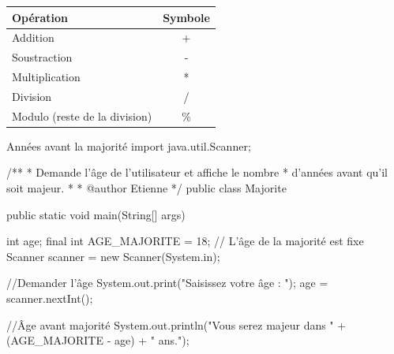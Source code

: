 \documentclass[12pt]{report}
\begin{document}
\begin{center}
\begin{tabularx}{0.5\linewidth}{X c} \toprule
\textbf{Opération} & \textbf{Symbole} \\ \midrule
Addition & + \\
Soustraction & - \\
Multiplication & * \\
Division & / \\
Modulo {\footnotesize (reste de la division)} & \% \\ \bottomrule
\end{tabularx}
\end{center}

\begin{MyTCB}{Années avant la majorité}
import java.util.Scanner;

/**
 * Demande l'âge de l'utilisateur et affiche le nombre
 * d'années avant qu'il soit majeur.
 * 
 * @author Etienne
 */
public class Majorite {

	public static void main(String[] args) {
		
		int age;
		final int AGE_MAJORITE = 18; // L'âge de la majorité est fixe
		Scanner scanner = new Scanner(System.in);
		
		//Demander l'âge
		System.out.print("Saisissez votre âge : ");
		age = scanner.nextInt();
		
		//Âge avant majorité
		System.out.println("Vous serez majeur dans " + (AGE_MAJORITE - age) + " ans.");

	}

}
\end{MyTCB}
\newpage
\end{document}
